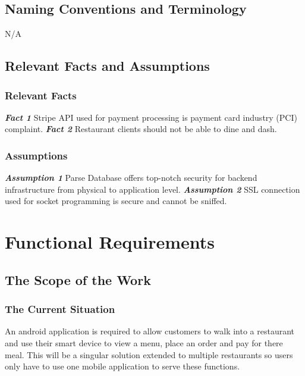 \documentclass[12pt, titlepage]{article}
\begin{document}
\subsection{Naming Conventions and Terminology}
N/A
\subsection{Relevant Facts and Assumptions} 
\subsubsection{Relevant Facts}
\textbf{\textit{Fact 1}}\newline
Stripe API used for payment processing is payment card industry (PCI) complaint.
\newline\newline
\textbf{\textit{Fact 2}}\newline
Restaurant clients should not be able to dine and dash.\newline

\subsubsection{Assumptions}

\textbf{\textit{Assumption  1}}\newline
Parse Database offers top-notch security for backend infrastructure from physical to application level.
\newline\newline
\textbf{\textit{Assumption  2}}\newline
SSL connection used for socket programming is secure and cannot be sniffed.

\section{Functional Requirements} 

\subsection{The Scope of the Work}
\subsubsection{The Current Situation}
An android application is required to allow customers to walk into a restaurant and use their smart device to view a menu, place an order and pay for there meal. This will be a singular solution extended to multiple restaurants so users only have to use one mobile application to serve these functions.
\end{document}
